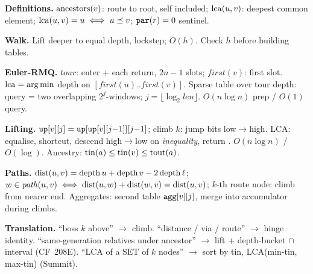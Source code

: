 \begin{quickref}
\textbf{Definitions.} \(\operatorname{ancestors}(v)\): route to root, self included;
\(\operatorname{lca}(u,v)\): deepest common element; \(\operatorname{lca}(u,v)=u \iff u \preceq v\);
\(\texttt{par}(r) = 0\) sentinel.

\medskip
\textbf{Walk.} Lift deeper to equal depth, lockstep; \(O(h)\).
Check \(h\) before building tables.

\medskip
\textbf{Euler-RMQ.} \(\mathit{tour}\): enter + each return, \(2n{-}1\)
slots; \(\mathit{first}(v)\): first slot. \(\operatorname{lca} = \arg\min\) depth on
\([\mathit{first}(u)..\mathit{first}(v)]\). Sparse table over tour
depth: query = two overlapping \(2^j\)-windows;
\(j = \lfloor\log_2 \mathit{len}\rfloor\).
\(O(n\log n)\) prep / \(O(1)\) query.

\medskip
\textbf{Lifting.} \(\texttt{up}[v][j] = \texttt{up}[\texttt{up}[v][j{-}1]][j{-}1]\);
climb \(k\): jump bits low\(\to\)high. LCA: equalise, shortcut,
descend high\(\to\)low on \emph{inequality}, return .
\(O(n\log n)\) / \(O(\log)\). Ancestry: \(\operatorname{tin}(a) \le \operatorname{tin}(v) \le
\operatorname{tout}(a)\).

\medskip
\textbf{Paths.} \(\operatorname{dist}(u,v) = \operatorname{depth} u + \operatorname{depth} v - 2\operatorname{depth}\ell\);
\(w \in \mathit{path}(u,v) \iff \operatorname{dist}(u,w)+\operatorname{dist}(w,v)=\operatorname{dist}(u,v)\);
\(k\)-th route node: climb from nearer end. Aggregates: second table
\(\texttt{agg}[v][j]\), merge into accumulator during climbs.

\medskip
\textbf{Translation.} ``boss \(k\) above'' \(\to\) climb.
``distance / via / route'' \(\to\) hinge identity.
``same-generation relatives under ancestor'' \(\to\) lift + depth-bucket
\(\cap\) interval (CF~208E). ``LCA of a SET of \(k\) nodes'' \(\to\)
sort by tin, LCA(min-tin, max-tin) (Summit).
\end{quickref}

